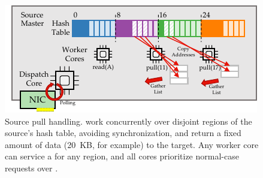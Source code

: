 \begin{figure}[t]
\centering
\includegraphics[width=0.9\columnwidth]{figures/rocksteady-source.pdf}
\caption{Source pull handling. \pulls work concurrently over disjoint
  regions of the source's hash table, avoiding synchronization, and
  return a fixed amount of data (20~KB, for example) to the target. Any
  worker core can service a \pull for any region, and all cores
  prioritize normal-case requests over \pulls.}%
\label{fig:source}%
\end{figure}
